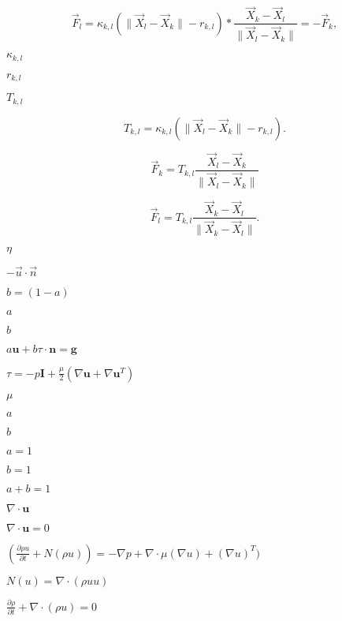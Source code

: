 \documentclass{article}
\begin{document}
\[
 
       \vec{F}_l = \kappa_{k,l} \left( \|\vec{X}_{l} - \vec{X}_{k}\| - r_{k,l} \right)
*\frac{\vec{X}_{k} - \vec{X}_{l}}{\|\vec{X}_{l} - \vec{X}_{k}\|} = - \vec{F}_k,
 
  \]
\pagebreak

$ \kappa_{k,l} $
\pagebreak

$ r_{k,l} $
\pagebreak

$ T_{k,l} $
\pagebreak

\[
 
       T_{k,l} = \kappa_{k,l} \left( \|\vec{X}_{l} - \vec{X}_{k}\| - r_{k,l} \right).
 
  \]
\pagebreak

\[
 
       \vec{F}_k = T_{k,l} \frac{\vec{X}_{l} - \vec{X}_{k}}{\|\vec{X}_{l} - \vec{X}_{k}\|}
 
  \]
\pagebreak

\[
 
       \vec{F}_l = T_{k,l} \frac{\vec{X}_{k} - \vec{X}_{l}}{\|\vec{X}_{k} - \vec{X}_{l}\|}.
 
  \]
\pagebreak

$ \eta $
\pagebreak

$ -\vec{u} \cdot \vec{n}$
\pagebreak

$ b = (1-a) $
\pagebreak

$a$
\pagebreak

$b$
\pagebreak

$ a\mathbf{u} + b\tau\cdot\mathbf{n} = \mathbf{g}$
\pagebreak

$\tau
= -p\mathbf{I} + \frac{\mu}{2}\left(\nabla\mathbf{u} + \nabla\mathbf{u}^T\right)$
\pagebreak

$\mu$
\pagebreak

$ a$
\pagebreak

$ b $
\pagebreak

$ a = 1 $
\pagebreak

$b = 1$
\pagebreak

$a + b = 1$
\pagebreak

$ \nabla \cdot \mathbf{u} $
\pagebreak

$ \nabla \cdot \mathbf{u}  = 0 $
\pagebreak

$(\frac{\partial \rho u}{\partial t} + N(\rho u)) = -\nabla p + \nabla \cdot \mu (\nabla u) + (\nabla u)^T )$
\pagebreak

$ N(u) = \nabla \cdot (\rho u u) $
\pagebreak

$ \frac{\partial \rho}{\partial t} + \nabla \cdot (\rho u) = 0 $
\pagebreak
\end{document}
